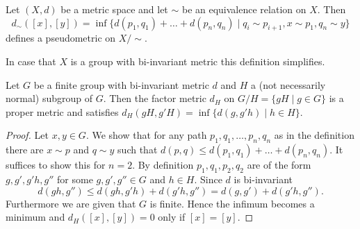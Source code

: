\begin{definition}
	Let $(X,d)$ be a metric space and let $\sim$ be an equivalence relation on $X$. Then \[d_\sim([x],[y])=\inf\{d(p_1,q_1)+\dots+d(p_n,q_n)\mid q_i\sim p_{i+1}, x\sim p_1, q_n\sim y\}\] defines a pseudometric on $X/{\sim}$.
\end{definition}
		
In case that $X$ is a group with bi-invariant metric this definition simplifies.
\begin{lemma}\label{lem:factorMetric}
	Let $G$ be a finite group with bi-invariant metric $d$ and $H$ a (not necessarily normal) subgroup of $G$. Then the factor metric $d_H$ on $G/H=\{gH\mid g\in G\}$ is a proper metric and satisfies $d_H(gH,g'H)=\inf\{d(g,g'h)\mid h\in H\}$.
\end{lemma}
\begin{proof}
	Let $x,y\in G$. We show that for any path $p_1,q_1,\dots,p_n,q_n$ as in the definition there are $x\sim p$ and $q\sim y$ such that $d(p,q)\leq d(p_1,q_1)+\dots+d(p_n,q_n)$. It suffices to show this for $n=2$. 
	By definition $p_1,q_1,p_2,q_2$ are of the form $g,g',g'h,g''$ for some $g,g',g''\in G$ and $h\in H$. Since $d$ is bi-invariant 
	\[d(gh,g'')\leq d(gh,g'h)+d(g'h,g'')=d(g,g')+d(g'h,g'').\]
	Furthermore we are given that $G$ is finite. Hence the infimum becomes a minimum and $d_H([x],[y])=0$ only if $[x]=[y]$.
\end{proof}
		
